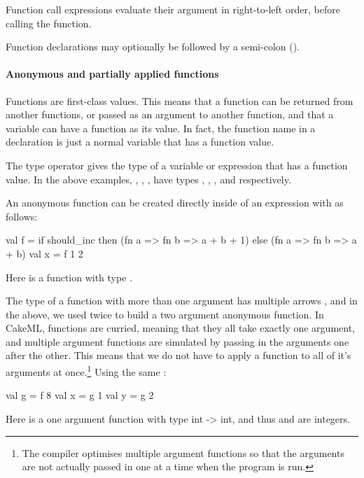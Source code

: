 \documentclass[12pt,a4paper]{book}
\begin{document}
Function call expressions evaluate their argument in right-to-left order,
before calling the function.

Function declarations may optionally be followed by a semi-colon (\smlinline{;}).

\paragraph{Anonymous and partially applied functions}

Functions are first-class values. This means that a function can be returned
from another functions, or passed as an argument to another function, and that
a variable can have a function as its value. In fact, the function name in a
 declaration is just a normal variable that has a function value.

The \smlinline{->} type operator gives the type of a variable or expression
that has a function value. In the above examples, ,
, ,  have types , , , and
 respectively.

An anonymous function can be created directly inside of an expression with  as follows:
\begin{smlcode}
val f =
  if should_inc then (fn a => fn b => a + b + 1)
  else (fn a => fn b => a + b)
val x = f 1 2
\end{smlcode}
Here  is a function with type .

The type of a function with more than one argument has multiple
arrows \smlinline{->}, and in the above, we used  twice to build a
two argument anonymous function. In CakeML, functions are curried, meaning that
they all take exactly one argument, and multiple argument functions are
simulated by passing in the arguments one after the other. This means that we do not have to
apply a function to all of it's arguments at once.\footnote{The compiler optimises multiple argument functions so that the arguments are not actually passed in one at a time when the program is run.} Using the same :
\begin{smlcode}
val g = f 8
val x = g 1
val y = g 2
\end{smlcode}
Here  is a one argument function with type {int -> int}, and thus
 and  are integers.
\end{document}
